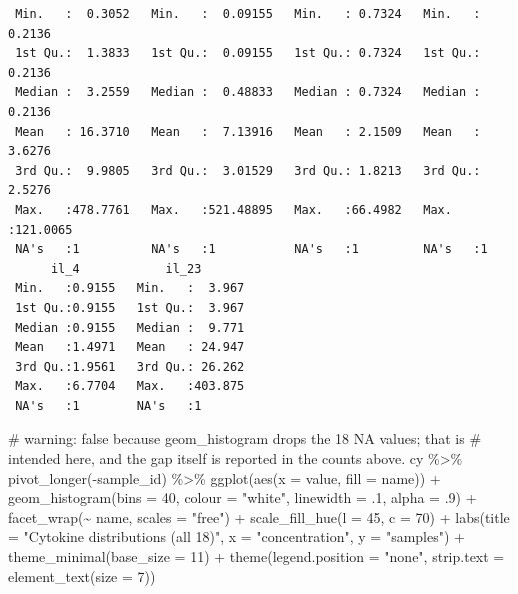 \documentclass[
  letterpaper,
  DIV=11,
  numbers=noendperiod]{scrartcl}
\newenvironment{Shaded}{\begin{snugshade}}{\end{snugshade}}
\newcommand{\AttributeTok}[1]{\textcolor[rgb]{0.40,0.45,0.13}{#1}}
\newcommand{\CommentTok}[1]{\textcolor[rgb]{0.37,0.37,0.37}{#1}}
\newcommand{\DecValTok}[1]{\textcolor[rgb]{0.68,0.00,0.00}{#1}}
\newcommand{\FunctionTok}[1]{\textcolor[rgb]{0.28,0.35,0.67}{#1}}
\newcommand{\NormalTok}[1]{\textcolor[rgb]{0.00,0.23,0.31}{#1}}
\newcommand{\SpecialCharTok}[1]{\textcolor[rgb]{0.37,0.37,0.37}{#1}}
\newcommand{\StringTok}[1]{\textcolor[rgb]{0.13,0.47,0.30}{#1}}
\newcounter{none} %
\begin{document}
\begin{verbatim}
 Min.   :  0.3052   Min.   :  0.09155   Min.   : 0.7324   Min.   :  0.2136  
 1st Qu.:  1.3833   1st Qu.:  0.09155   1st Qu.: 0.7324   1st Qu.:  0.2136  
 Median :  3.2559   Median :  0.48833   Median : 0.7324   Median :  0.2136  
 Mean   : 16.3710   Mean   :  7.13916   Mean   : 2.1509   Mean   :  3.6276  
 3rd Qu.:  9.9805   3rd Qu.:  3.01529   3rd Qu.: 1.8213   3rd Qu.:  2.5276  
 Max.   :478.7761   Max.   :521.48895   Max.   :66.4982   Max.   :121.0065  
 NA's   :1          NA's   :1           NA's   :1         NA's   :1         
      il_4            il_23        
 Min.   :0.9155   Min.   :  3.967  
 1st Qu.:0.9155   1st Qu.:  3.967  
 Median :0.9155   Median :  9.771  
 Mean   :1.4971   Mean   : 24.947  
 3rd Qu.:1.9561   3rd Qu.: 26.262  
 Max.   :6.7704   Max.   :403.875  
 NA's   :1        NA's   :1        
\end{verbatim}

\begin{Shaded}
\begin{Highlighting}[]
\CommentTok{\# warning: false because geom\_histogram drops the 18 NA values; that is}
\CommentTok{\# intended here, and the gap itself is reported in the counts above.}
\NormalTok{cy }\SpecialCharTok{\%\textgreater{}\%}
  \FunctionTok{pivot\_longer}\NormalTok{(}\SpecialCharTok{{-}}\NormalTok{sample\_id) }\SpecialCharTok{\%\textgreater{}\%}
  \FunctionTok{ggplot}\NormalTok{(}\FunctionTok{aes}\NormalTok{(}\AttributeTok{x =}\NormalTok{ value, }\AttributeTok{fill =}\NormalTok{ name)) }\SpecialCharTok{+}
  \FunctionTok{geom\_histogram}\NormalTok{(}\AttributeTok{bins =} \DecValTok{40}\NormalTok{, }\AttributeTok{colour =} \StringTok{"white"}\NormalTok{, }\AttributeTok{linewidth =}\NormalTok{ .}\DecValTok{1}\NormalTok{, }\AttributeTok{alpha =}\NormalTok{ .}\DecValTok{9}\NormalTok{) }\SpecialCharTok{+}
  \FunctionTok{facet\_wrap}\NormalTok{(}\SpecialCharTok{\textasciitilde{}}\NormalTok{ name, }\AttributeTok{scales =} \StringTok{"free"}\NormalTok{) }\SpecialCharTok{+}
  \FunctionTok{scale\_fill\_hue}\NormalTok{(}\AttributeTok{l =} \DecValTok{45}\NormalTok{, }\AttributeTok{c =} \DecValTok{70}\NormalTok{) }\SpecialCharTok{+}
  \FunctionTok{labs}\NormalTok{(}\AttributeTok{title =} \StringTok{"Cytokine distributions (all 18)"}\NormalTok{, }\AttributeTok{x =} \StringTok{"concentration"}\NormalTok{, }\AttributeTok{y =} \StringTok{"samples"}\NormalTok{) }\SpecialCharTok{+}
  \FunctionTok{theme\_minimal}\NormalTok{(}\AttributeTok{base\_size =} \DecValTok{11}\NormalTok{) }\SpecialCharTok{+}
  \FunctionTok{theme}\NormalTok{(}\AttributeTok{legend.position =} \StringTok{"none"}\NormalTok{, }\AttributeTok{strip.text =} \FunctionTok{element\_text}\NormalTok{(}\AttributeTok{size =} \DecValTok{7}\NormalTok{))}
\end{Highlighting}
\end{Shaded}
\end{document}
